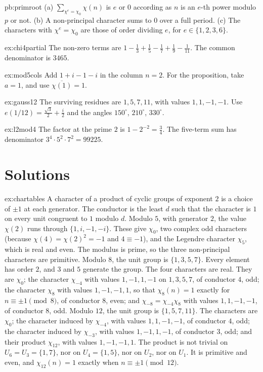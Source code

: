 \begin{hint}{pb:primroot}
(a) $\sum_{\chi^e=\chi_0}\chi(n)$ is $e$ or $0$ according as $n$ is an $e$-th power modulo $p$ or not. (b) A non-principal character sums to $0$ over a full period.
(c) The characters with $\chi^e=\chi_0$ are those of order dividing $e$, for $e\in\{1,2,3,6\}$.
\end{hint}

\begin{hint}{ex:chi4partial}
The non-zero terms are $1-\frac13+\frac15-\frac17+\frac19-\frac1{11}$. The common denominator is $3465$.
\end{hint}
\begin{hint}{ex:mod5cols}
Add $1+i-1-i$ in the column $n=2$. For the proposition, take $a=1$, and use $\overline{\chi(1)}=1$.
\end{hint}
\begin{hint}{ex:gauss12}
The surviving residues are $1,5,7,11$, with values $1,1,-1,-1$. Use $e(1/12)=\frac{\sqrt3}2+\frac i2$ and the angles $150^\circ$, $210^\circ$, $330^\circ$.
\end{hint}
\begin{hint}{ex:l2mod4}
The factor at the prime $2$ is $1-2^{-2}=\frac34$. The five-term sum has denominator $3^4\cdot5^2\cdot7^2=99225$.
\end{hint}

\section{Solutions}

\begin{solution}{ex:chartables}
\idea A character of a product of cyclic groups of exponent $2$ is a choice of $\pm1$ at each generator. The conductor is the least $d$ such that the character is $1$ on every unit congruent to $1$ modulo $d$.
\writeup Modulo $5$, with generator $2$, the value $\chi(2)$ runs through $\{1,i,-1,-i\}$. These give $\chi_0$, two complex odd characters (because $\chi(4)=\chi(2)^2=-1$ and $4\equiv-1$), and the Legendre character $\chi_5$, which is real and even. The modulus is prime, so the three non-principal characters are primitive. Modulo $8$, the unit group is $\{1,3,5,7\}$. Every element has order $2$, and $3$ and $5$ generate the group. The four characters are real. They are $\chi_0$; the character $\chi_{-4}$ with values $1,-1,1,-1$ on $1,3,5,7$, of conductor $4$, odd; the character $\chi_8$ with values $1,-1,-1,1$, so that $\chi_8(n)=1$ exactly for $n\equiv\pm1\pmod8$, of conductor $8$, even; and $\chi_{-8}=\chi_{-4}\chi_8$ with values $1,1,-1,-1$, of conductor $8$, odd. Modulo $12$, the unit group is $\{1,5,7,11\}$. The characters are $\chi_0$; the character induced by $\chi_{-4}$, with values $1,1,-1,-1$, of conductor $4$, odd; the character induced by $\chi_{-3}$, with values $1,-1,1,-1$, of conductor $3$, odd; and their product $\chi_{12}$, with values $1,-1,-1,1$. The product is not trivial on $U_6=U_3=\{1,7\}$, nor on $U_4=\{1,5\}$, nor on $U_2$, nor on $U_1$. It is primitive and even, and $\chi_{12}(n)=1$ exactly when $n\equiv\pm1\pmod{12}$.
\end{solution}

